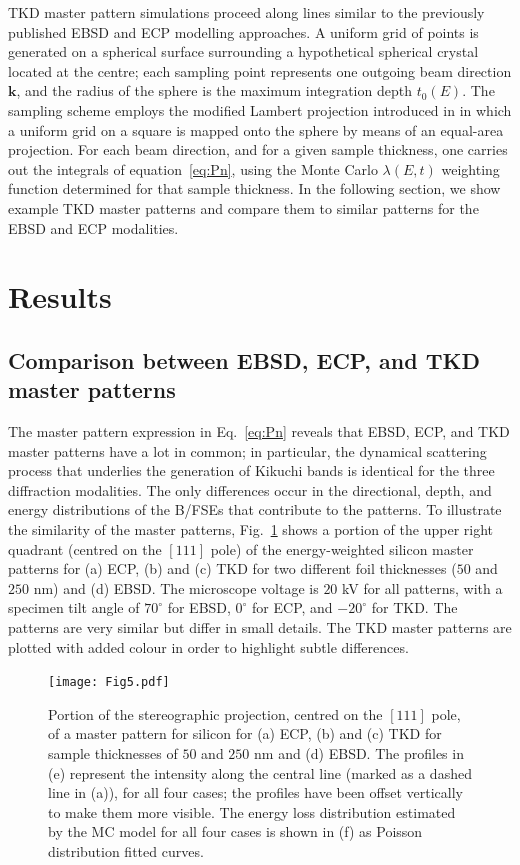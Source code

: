 TKD master pattern simulations proceed along lines similar to the previously published EBSD \cite{degraef2013e} and ECP \cite{degraef2017k} modelling approaches. A uniform grid of points is generated on a spherical surface surrounding a hypothetical spherical crystal located at the centre; each sampling point represents one outgoing beam direction $\mathbf{k}$, and the radius of the sphere is the maximum integration depth $t_0(E)$.  The sampling scheme employs the modified Lambert projection introduced in \cite{rosca2010a,degraef2013e} in which a uniform grid on a square is mapped onto the sphere by means of an equal-area projection. For each beam direction, and for a given sample thickness, one carries out the integrals of equation~\ref{eq:Pn}, using the Monte Carlo $\lambda(E,t)$ weighting function determined for that sample thickness.  In the following section, we show example TKD master patterns and compare them to similar patterns for the EBSD and ECP modalities.



\section{Results\label{sec:results}}

\subsection{Comparison between EBSD, ECP, and TKD master patterns}
\label{sec:comparison}
The master pattern expression in Eq.~\ref{eq:Pn} reveals that EBSD, ECP, and TKD master patterns have a lot in common; in particular, the dynamical scattering process that underlies the generation of Kikuchi bands is identical for the three diffraction modalities. The only differences occur in the directional, depth, and energy distributions of the B/FSEs that contribute to the patterns.  To illustrate the similarity of the master patterns, Fig.~\ref{fig:MPs} shows a portion of the upper right quadrant (centred on the $[111]$ pole) of the energy-weighted silicon master patterns for (a) ECP, (b) and (c) TKD for two different foil thicknesses ($50$ and $250$ nm) and (d) EBSD. The  microscope voltage is $20$ kV for all patterns, with a specimen tilt angle of $70^{\circ}$ for EBSD, $0^{\circ}$ for ECP, and $-20^{\circ}$ for TKD.  The patterns are very similar but differ in small details. The TKD master patterns are plotted with added colour in order to highlight  subtle differences.

\begin{figure}[t]
\centering\leavevmode
\texttt{[image: Fig5.pdf]}%
\caption{Portion of the stereographic projection, centred on the $[111]$ pole, of a master pattern for silicon for (a) ECP, (b) and  (c) TKD for sample thicknesses of $50$ and $250$ nm and (d) EBSD. The profiles in (e) represent the intensity along the central line (marked as a dashed line in (a)), for all four cases; the profiles have been offset vertically to make them more visible. The energy loss distribution estimated by the MC model for all four cases is shown in (f) as Poisson distribution fitted curves. }
\label{fig:MPs}
\end{figure}

